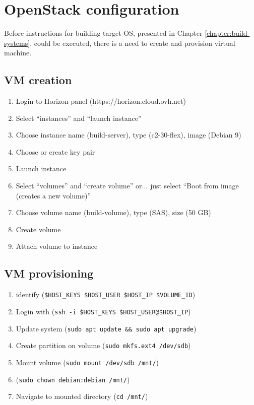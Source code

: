 \documentclass[printmode]{mgr}
\begin{document}
\section{OpenStack configuration}

Before instructions for building target OS, presented in Chapter \ref{chapter:build-systems}, could be executed, there is a need to create and provision virtual machine.





\subsection*{VM creation}

\begin{enumerate}
  \item Login to Horizon panel (https://horizon.cloud.ovh.net)
  \item Select ``instances'' and ``launch instance''
  \item Choose instance name (build-server), type (c2-30-flex), image (Debian 9)
  \item Choose or create key pair
  \item Launch instance
  \item Select ``volumes'' and ``create volume'' or... just select ``Boot from image (creates a new volume)'' 
  \item Choose volume name (build-volume), type (SAS), size (50 GB)
  \item Create volume
  \item Attach volume to instance
\end{enumerate}

\subsection{VM provisioning}

\begin{enumerate}
  \item identify (\verb|$HOST_KEYS $HOST_USER $HOST_IP $VOLUME_ID|)
  \item Login with (\verb|ssh -i $HOST_KEYS $HOST_USER@$HOST_IP|)
  \item Update system (\verb|sudo apt update && sudo apt upgrade|)
  \item Create partition on volume (\verb|sudo mkfs.ext4 /dev/sdb|)
  \item Mount volume (\verb|sudo mount /dev/sdb /mnt/|)
  \item (\verb|sudo chown debian:debian /mnt/|)
  \item Navigate to mounted directory (\verb|cd /mnt/|)
\end{enumerate}
\end{document}
